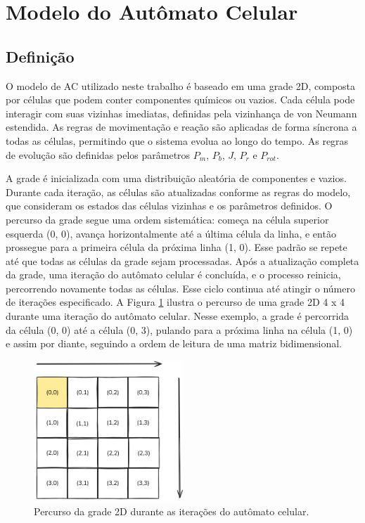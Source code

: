 \documentclass[12pt,oneside]{report}
\begin{document}
\section{Modelo do Autômato Celular}

\subsection{Definição}

O modelo de AC utilizado neste trabalho é baseado em uma grade 2D, composta por células que podem conter componentes químicos ou vazios. Cada célula pode interagir com suas vizinhas imediatas, definidas pela vizinhança de von Neumann estendida. As regras de movimentação e reação são aplicadas de forma síncrona a todas as células, permitindo que o sistema evolua ao longo do tempo. As regras de evolução são definidas pelos parâmetros \hyperref[subsubsec:Pm]{$P_m$}, \hyperref[subsubsec:Pb]{$P_b$}, \hyperref[subsubsec:J]{$J$}, \hyperref[subsubsec:Pr]{$P_r$} e \hyperref[subsubsec:Prot]{$P_{rot}$}.

A grade é inicializada com uma distribuição aleatória de componentes e vazios. Durante cada iteração, as células são atualizadas conforme as regras do modelo, que consideram os estados das células vizinhas e os parâmetros definidos. O percurso da grade segue uma ordem sistemática: começa na célula superior esquerda (0, 0), avança horizontalmente até a última célula da linha, e então prossegue para a primeira célula da próxima linha (1, 0). Esse padrão se repete até que todas as células da grade sejam processadas. Após a atualização completa da grade, uma iteração do autômato celular é concluída, e o processo reinicia, percorrendo novamente todas as células. Esse ciclo continua até atingir o número de iterações especificado. A Figura \ref{fig:percorre_grade} ilustra o percurso de uma grade 2D 4 x 4 durante uma iteração do autômato celular. Nesse exemplo, a grade é percorrida da célula (0, 0) até a célula (0, 3), pulando para a próxima linha na célula (1, 0) e assim por diante, seguindo a ordem de leitura de uma matriz bidimensional.

\begin{figure}[H]
    \centering
    \includegraphics[width=0.5\textwidth]{percorre_grade.png}
    \caption{\small Percurso da grade 2D durante as iterações do autômato celular.}
    \label{fig:percorre_grade}
\end{figure}
\end{document}
